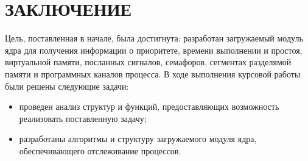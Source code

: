 \chapter*{ЗАКЛЮЧЕНИЕ}

Цель, поставленная в начале, была достигнута: разработан загружаемый модуль ядра для получения информации о приоритете, времени выполнении и простоя, виртуальной памяти, посланных сигналов, семафоров, сегментах разделямой памяти и программных каналов процесса. 
В ходе выполнения курсовой работы были решены следующие задачи:
\begin{itemize}
	\item проведен анализ структур и функций, предоставляющих возможность реализовать поставленную задачу;
	\item разработаны алгоритмы и структуру загружаемого модуля ядра, обеспечивающего отслеживание процессов.  
\end{itemize}



